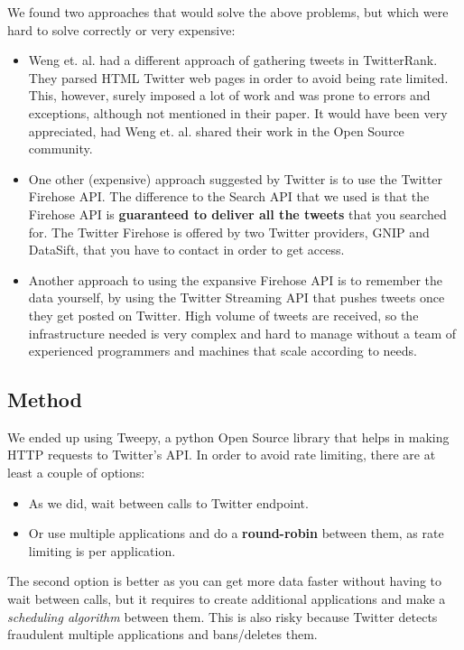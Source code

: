 We found two approaches that would solve the above problems, but which were hard to solve correctly or very expensive:
\begin{itemize}
	\item Weng et. al. had a different approach of gathering tweets in TwitterRank\cite{twitterrank}. They parsed HTML Twitter web pages in order to avoid being rate limited. This, however, surely imposed a lot of work and was prone to errors and exceptions, although not mentioned in their paper. It would have been very appreciated, had Weng et. al. shared their work in the Open Source community.
	\item One other (expensive) approach suggested by Twitter is to use the Twitter Firehose API. The difference to the Search API that we used is that the Firehose API is \textbf{guaranteed to deliver all the tweets} that you searched for. The Twitter Firehose is offered by two Twitter providers, GNIP and DataSift, that you have to contact in order to get access.
    \item Another approach to using the expansive Firehose API is to remember the data yourself, by using the Twitter Streaming API that pushes tweets once they get posted on Twitter. High volume of tweets are received, so the infrastructure needed is very complex and hard to manage without a team of experienced programmers and machines that scale according to needs.
\end{itemize}

\subsection{Method}

We ended up using Tweepy, a python Open Source library that helps in making HTTP requests to Twitter's API. In order to avoid rate limiting, there are at least a couple of options:
\begin{itemize}
	\item As we did, wait between calls to Twitter endpoint.
    \item Or use multiple applications and do a \textbf{round-robin} between them, as rate limiting is per application.
\end{itemize}

The second option is better as you can get more data faster without having to wait between calls, but it requires to create additional applications and make a \textit{scheduling algorithm} between them. This is also risky because Twitter detects fraudulent multiple applications and bans/deletes them.

